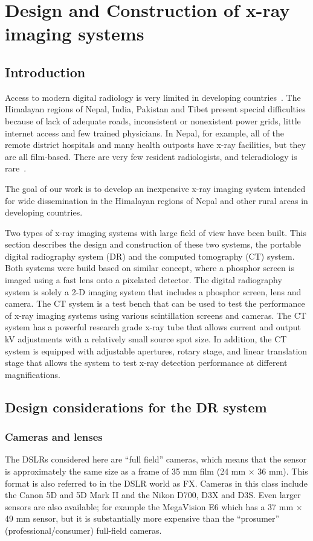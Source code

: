 \chapter{Design and Construction of x-ray imaging systems}
\label{chap:design_construction}

\section{Introduction}
Access to modern digital radiology is very limited in developing countries~\citep{telehealth2009}. The Himalayan regions of Nepal,
India, Pakistan and Tibet present special difficulties because of lack of adequate roads, inconsistent or nonexistent power
grids, little internet access and few trained physicians. In Nepal, for example, all of the remote district hospitals and
many health outposts have x-ray facilities, but they are all film-based. There are very few resident radiologists, and
teleradiology is rare~\citep{telehealth2009, Graham2003}.

The goal of our work is to develop an inexpensive x-ray imaging system intended for wide dissemination in the Himalayan regions of Nepal and other rural areas in developing countries.

Two types of x-ray imaging systems with large field of view have been built.  This section describes the design and construction of these two systems, the portable digital radiography system (DR) and the computed tomography (CT) system.  Both systems were build based on similar concept, where a phosphor screen is imaged using a fast lens onto a pixelated detector.  The digital radiography system is solely a 2-D imaging system that includes a phosphor screen, lens and camera.  The CT system is a test bench that can be used to test the performance of x-ray imaging systems using various scintillation screens and cameras.  The CT system has a powerful research grade x-ray tube that allows current and output kV adjustments with a relatively small source spot size.  In addition, the CT system is equipped with adjustable apertures, rotary stage, and linear translation stage that allows the system to test x-ray detection performance at different magnifications.

\section{Design considerations for the DR system}
\label{sect:design_considerations_for_DR}
\subsection{Cameras and lenses}
\label{subsect:camera_lenses}
The DSLRs considered here are ``full field'' cameras, which means that the sensor is approximately the same size as a frame of 35 mm film (24 mm $\times$ 36 mm).  This format is also referred to in the DSLR world as FX. Cameras in this class include the Canon 5D and 5D Mark II and the Nikon D700, D3X and D3S. Even larger sensors are also available; for example the MegaVision E6 which has a 37 mm $\times$ 49 mm sensor, but it is substantially more expensive than the ``prosumer'' (professional/consumer) full-field cameras.

